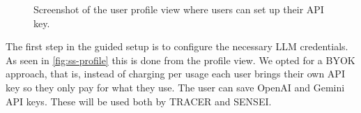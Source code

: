 \begin{figure}[!htb]
  \centering
  \caption{Screenshot of the user profile view where users can set up their API key.}
  \label{fig:ss-profile}
\end{figure}

The first step in the guided setup
is to configure the necessary \ac{LLM} credentials.
As seen in \autoref{fig:ss-profile}
this is done from the profile view.
We opted for a \ac{BYOK} approach,
that is, instead of charging per usage
each user brings their own \ac{API} key
so they only pay for what they use.
The user can save OpenAI and Gemini \ac{API} keys.
These will be used both by \ac{TRACER} and SENSEI.

